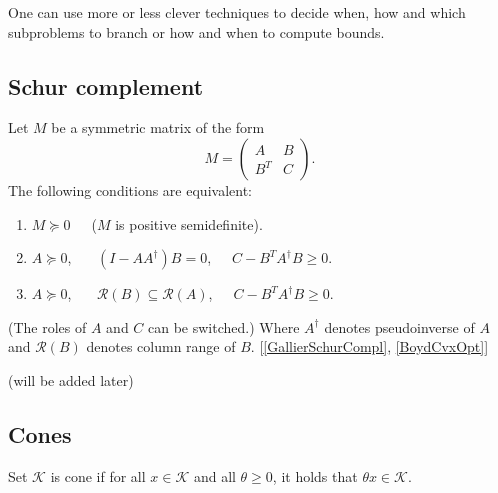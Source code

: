 \documentclass[10pt,oneside]{book}
\theoremstyle{definition}
\begin{document}
One can use more or less clever techniques to decide when, how and which subproblems to branch or how and when to compute bounds.


\begin{appendix}


\chapter{ }
\section{Schur complement}

\label{SchurCompl}
Let $M$ be a symmetric matrix of the form
$$M = \left(\begin{array}{cc}
A & B\\
B^T & C
\end{array}\right).$$ 
The following conditions are equivalent:
\begin{enumerate}
\item $M\succeq 0$\ \ \ ($M$ is positive semidefinite).
\item $A\succeq 0$, \ \ \ $(I-AA^\dagger)B = 0$,\ \ \ $C - B^TA^\dagger B \geq 0$.
\item $A\succeq 0$, \ \ \ $\mathcal{R}(B)\subseteq \mathcal{R}(A)$,\ \ \ $C - B^TA^\dagger B \geq 0$.
\end{enumerate}
(The roles of $A$ and $C$ can be switched.)
Where $A^\dagger$ denotes pseudoinverse of $A$ and $\mathcal{R}(B)$ denotes column range of $B$. \rm [\ref{GallierSchurCompl}, \ref{BoydCvxOpt}]

\proof (will be added later)


\section{Cones}
\label{Cones}

\label{defCone}
Set $\mathcal{K}$ is cone if for all $x\in \mathcal{K}$ and all $\theta\geq 0$, it holds that $\theta x \in \mathcal{K}$.


\end{appendix}
\end{document}

